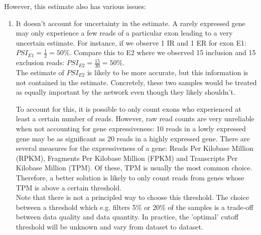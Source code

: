 However, this estimate also has various issues:
\begin{enumerate}[label=(\alph*)]
	\item It doesn't account for uncertainty in the estimate. A rarely expressed gene may only experience a few reads of a particular exon leading to a very uncertain estimate. For instance, if we observe 1 IR and 1 ER for exon E1: $PSI_{E1} = \frac{1}{2} = 50\%$. Compare this to E2 where we observed 15 inclusion and 15 exclusion reads: $PSI_{E2} = \frac{15}{30} = 50\%$.\\
	The estimate of $PSI_{E2}$ is likely to be more accurate, but this information is not contained in the estimate. Concretely, these two samples would be treated as equally important by the network even though they likely shouldn't.
	
	To account for this, it is possible to only count exons who experienced at least a certain number of reads. However, raw read counts are very unreliable when not accounting for gene expressiveness: 10 reads in a lowly expressed gene may be as significant as 20 reads in a highly expressed gene. There are several measures for the expressiveness of a gene: Reads Per Kilobase Million (RPKM), Fragments Per Kilobase Million (FPKM) and Transcripts Per Kilobase Million (TPM). Of these, TPM is usually the most common choice. Therefore, a better solution is likely to only count reads from genes whose TPM is above a certain threshold. \\
	Note that there is not a principled way to choose this threshold. The choice between a threshold which e.g. filters 5\% or 20\% of the samples is a trade-off between data quality and data quantity. In practice, the 'optimal' cutoff threshold will be unknown and vary from dataset to dataset.


\end{enumerate}

